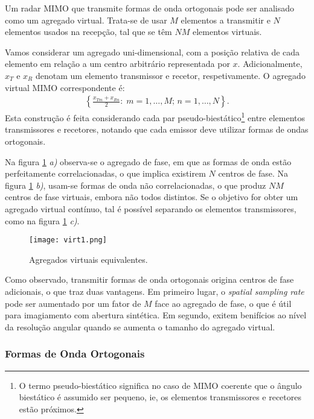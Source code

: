 \documentclass[purist,portuguese]{ist-report}
\begin{document}
Um radar MIMO que transmite formas de onda ortogonais pode ser analisado como um agregado virtual.
Trata-se de usar $M$ elementos a transmitir e $N$ elementos usados na recepção, tal que se têm $NM$ elementos virtuais.

Vamos considerar um agregado uni-dimensional, com a posição relativa de cada elemento em relação a um centro arbitrário representada por $x$. 
Adicionalmente, $x_T$ e $x_R$ denotam um elemento transmissor e recetor, respetivamente.
O agregado virtual MIMO correspondente é:
\begin{align}
  \left\{ \frac{x_{Tm}+x_{Rn}}{2}:\; m=1,\ldots,M;\,n=1,\ldots,N \right\}.
  \label{eq:virtualmimo}
\end{align}
Esta construção é feita considerando cada par pseudo-biestático\footnote{O termo pseudo-biestático significa no caso de MIMO coerente que o ângulo biestático é assumido ser pequeno, ie, os elementos transmissores e recetores estão próximos.} entre elementos transmissores e recetores, notando que cada emissor deve utilizar formas de ondas ortogonais.

Na figura \ref{fig:virt1} \emph{a)} observa-se o agregado de fase, em que as formas de onda estão perfeitamente correlacionadas, o que implica existirem $N$ centros de fase.
Na figura \ref{fig:virt1} \emph{b)}, usam-se formas de onda não correlacionadas, o que produz $NM$ centros de fase virtuais, embora não todos distintos.
Se o objetivo for obter um agregado virtual contínuo, tal é possível separando os elementos transmissores, como na figura \ref{fig:virt1} \emph{c)}. 

\begin{figure}[h]
  \centering
  \texttt{[image: virt1.png]}
  \caption{Agregados virtuais equivalentes.}
  \label{fig:virt1}
\end{figure}

Como observado, transmitir formas de onda ortogonais origina centros de fase adicionais, o que traz duas vantagens.
Em primeiro lugar, o \textit{spatial sampling rate} pode ser aumentado por um fator de $M$ face ao agregado de fase, o que é útil para imagiamento com abertura sintética.
Em segundo, exitem benifícios ao nível da resolução angular quando se aumenta o tamanho do agregado virtual.

\subsubsection{Formas de Onda Ortogonais}
\end{document}

